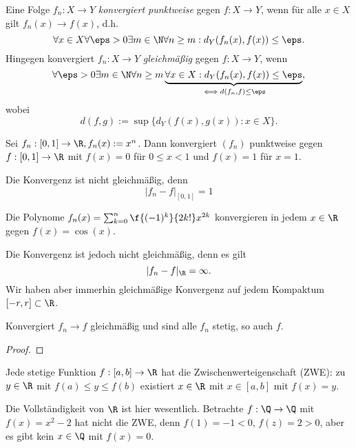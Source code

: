 \begin{df}
	Eine Folge $f_n: X \to Y$ \emph{konvergiert punktweise} gegen $f: X \to Y$, wenn für alle $x \in X$ gilt $f_n(x) \to f(x)$, d.h.
	\[
		\forall x \in X \forall \eps > 0 \exists m \in \N \forall n \ge m : d_Y(f_n(x), f(x)) \le \eps.
	\]
	Hingegen konvergiert $f_n: X \to Y$ \emph{gleichmäßig} gegen $f: X \to Y$, wenn
	\[
		\forall \eps > 0 \exists m \in \N \forall n \ge m \underbrace{\forall x \in X : d_Y(f_n(x), f(x)) \le \eps}_{\iff d (f_n, f) \le \eps},
	\]
	wobei
	\[
		d(f,g)
		:= \sup \{ d_Y(f(x), g(x)) : x \in X \}.
	\]
\end{df}

\begin{ex}
	Sei $f_n : [0,1] \to \R, f_n(x) := x^n$.
	Dann konvergiert $(f_n)$ punktweise gegen $f:[0,1] \to \R$ mit $f(x) = 0$ für $0 \le x < 1$ und $f(x) = 1$ für $x=1$.

	Die Konvergenz ist nicht gleichmäßig, denn
	\[
		|f_n - f|_{[0,1]} = 1
	\]
\end{ex}

\begin{ex}
	Die Polynome $f_n(x) = \sum_{k=0}^n \f{(-1)^k}{2k!} x^{2k}$ konvergieren in jedem $x \in \R$ gegen $f(x) = \cos(x)$.

	Die Konvergenz ist jedoch nicht gleichmäßig, denn es gilt
	\[
		|f_n - f|_{\R} = \infty.
	\]
	Wir haben aber immerhin gleichmäßige Konvergenz auf jedem Kompaktum $[-r,r] \subset \R$.
\end{ex}

\begin{st}
	Konvergiert $f_n \to f$ gleichmäßig und sind alle $f_n$ stetig, so auch $f$.
	\begin{proof}
	\end{proof}
\end{st}

\begin{st}
	Jede stetige Funktion $f: [a,b] \to \R$ hat die Zwischenwerteigenschaft (ZWE): zu $y \in \R$ mit $f(a) \le y \le f(b)$ existiert $x \in \R$ mit $x \in [a,b]$ mit $f(x) = y$.
	\begin{nt*}
		Die Vollständigkeit von $\R$ ist hier wesentlich.
		Betrachte $f: \Q \to \Q$ mit $f(x) = x^2 - 2$ hat nicht die ZWE, denn $f(1) = - 1 < 0$, $f(z) = 2 > 0$, aber es gibt kein $x \in \Q$ mit $f(x) = 0$.
	\end{nt*}
\end{st}

